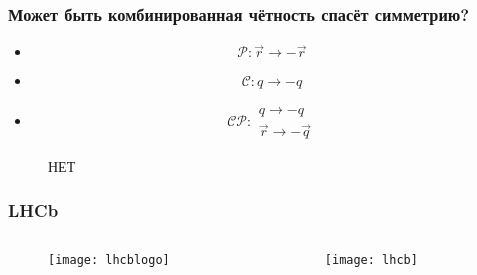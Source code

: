 \begin{frame}
    \frametitle{Может быть комбинированная чётность спасёт симметрию?}
    \begin{itemize}[<+->]
        \item
            \begin{equation*}
                \mathcal{P}: \vec{r} \to - \vec{r}
            \end{equation*}
        \item
            \begin{equation*}
                \mathcal{C}: q \to - q
            \end{equation*}
        \item
            \begin{equation*}
                \mathcal{CP}:
                \begin{array}{c}
                    q \to - q \\
                    \vec{r} \to - \vec{q}
                \end{array}
            \end{equation*}
    \end{itemize}
\end{frame}
\begin{frame}
    \begin{figure}
        {\LARGE НЕТ}
    \end{figure}
\end{frame}

\begin{frame}
    \frametitle{LHCb}
    \begin{columns}
        \begin{column}{0.5\textwidth}
            \begin{figure}
                \begin{centering}
                    \texttt{[image: lhcblogo]}
                \end{centering}
            \end{figure}
        \end{column}
        \begin{column}{0.5\textwidth}
            \begin{figure}
                \begin{centering}
                    \texttt{[image: lhcb]}
                \end{centering}
            \end{figure}
        \end{column}
    \end{columns}
\end{frame}


